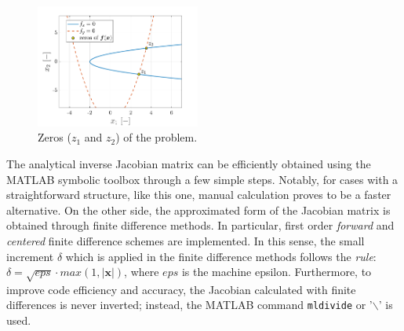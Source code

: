 \documentclass[11pt,a4paper,oneside]{article}
\renewcommand{\vec}[1]{\mathbf{#1}}
\begin{document}
\begin{figure}
    \centering
    \vspace{-0.3cm}
    
        \includegraphics[width = 0.48\textwidth]{gfx/ex1_3.pdf}
        \caption{Zeros ($z_1$ and $z_2$) of the problem.}\label{fig:ex1_2}
\end{figure}
The analytical inverse Jacobian matrix can be efficiently obtained using the MATLAB symbolic toolbox 
through a few simple steps. Notably, for cases with a straightforward structure, like this one, 
manual calculation proves to be a faster alternative.
 On the other side, the approximated form of the Jacobian matrix is obtained 
through finite difference methods. In particular, first order \textit{forward} and \textit{centered} 
finite difference schemes are implemented. In this sense, the small increment $\delta$ which is applied 
in the finite difference methods follows the \textit{rule}: 
$\delta=\sqrt{eps}\cdot max(1, |\vec{x}|)$, where $eps$ is the machine epsilon. 
Furthermore, to improve code efficiency and accuracy, the Jacobian calculated with finite differences 
is never inverted; instead, the MATLAB command \texttt{mldivide} or '$\backslash$' is used. 
\end{document}
